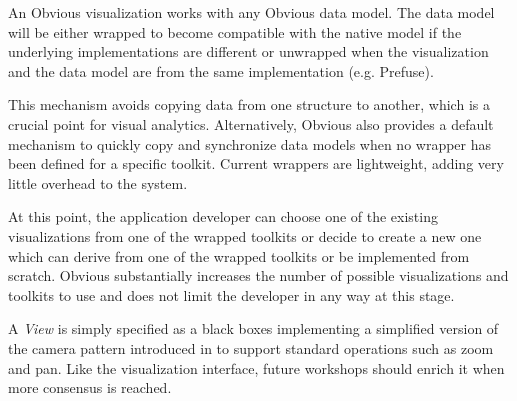 An Obvious visualization works with any Obvious data model.  The data
model will be either wrapped to become compatible with the native
model if the underlying implementations are different or unwrapped
when the visualization and the data model are from the same
implementation (e.g. Prefuse).

This mechanism avoids copying data from one structure to another,
which is a crucial point for visual analytics.  Alternatively, Obvious
also provides a default mechanism to quickly copy and synchronize data
models when no wrapper has been defined for a specific toolkit.
Current wrappers are lightweight, adding very little overhead to the
system.

At this point, the application developer can choose one of the
existing visualizations from one of the wrapped toolkits or decide to
create a new one which can derive from one of the wrapped toolkits or
be implemented from scratch.  Obvious substantially increases the
number of possible visualizations and toolkits to use and does not
limit the developer in any way at this stage.

A \emph{View} is simply specified as a black boxes implementing a
simplified version of the camera pattern introduced in
\cite{DesignPatternsIV} to support standard operations such as zoom
and pan.  Like the visualization interface, future workshops should
enrich it when more consensus is reached.

